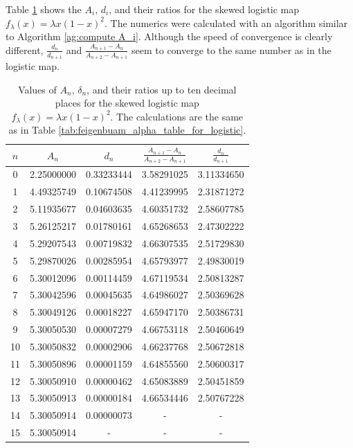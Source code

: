 Table \ref{tab:feigenbuam_constants_skewed_logistic_map} shows the $A_i$, $d_i$, and their ratios for the skewed logistic map $f_{\lambda} (x) = \lambda x (1-x)^2$.
The numerics were calculated with an algorithm similar to Algorithm \ref{ag:compute A_i}.
Although the speed of convergence is clearly different, 
$ \frac{d_n}{d_{n+1}} $ and $\frac{A_{n+1} - A_n}{A_{n+2} - A_{n+1}}$ seem to converge to the same number as in the logistic map.
\begin{table}
\centering
\begin{tabular}{|c|c|c|c|c|}
\hline
\( n \) & \( A_n \) & \( d_n \)  & \(\frac{A_{n+1} - A_n}{A_{n+2} - A_{n+1}}\)  &  \(\frac{d_n}{d_{n+1}}\) \\ \hline
0 & 2.25000000 & 0.33233444 & 3.58291025 & 3.11334650 \\
1 & 4.49325749 & 0.10674508 & 4.41239995 & 2.31871272 \\
2 & 5.11935677 & 0.04603635 & 4.60351732 & 2.58607785 \\
3 & 5.26125217 & 0.01780161 & 4.65268653 & 2.47302222 \\
4 & 5.29207543 & 0.00719832 & 4.66307535 & 2.51729830 \\
5 & 5.29870026 & 0.00285954 & 4.65793977 & 2.49830019 \\
6 & 5.30012096 & 0.00114459 & 4.67119534 & 2.50813287 \\
7 & 5.30042596 & 0.00045635 & 4.64986027 & 2.50369628 \\
8 & 5.30049126 & 0.00018227 & 4.65947170 & 2.50386731 \\
9 & 5.30050530 & 0.00007279 & 4.66753118 & 2.50460649 \\
10 & 5.30050832 & 0.00002906 & 4.66237768 & 2.50672818 \\
11 & 5.30050896 & 0.00001159 & 4.64855560 & 2.50600317 \\
12 & 5.30050910 & 0.00000462 & 4.65083889 & 2.50451859 \\
13 & 5.30050913 & 0.00000184 & 4.66534446 & 2.50767228 \\
14 & 5.30050914 & 0.00000073 &  - &  - \\
15 & 5.30050914 &  - &  - &  - \\
\hline
\end{tabular}
\caption{
	Values of \( A_n \), \( \delta_n \), and their ratios up to ten decimal places for the skewed logistic map $f_{\lambda}(x) = \lambda x(1-x)^2$.
	The calculations are the same as in Table \ref{tab:feigenbuam_alpha_table_for_logistic}.
}
\label{tab:feigenbuam_constants_skewed_logistic_map}
\end{table}